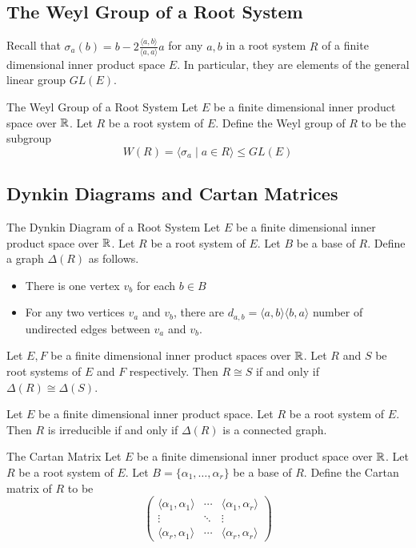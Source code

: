 \documentclass[a4paper]{article}
\begin{document}
\subsection{The Weyl Group of a Root System}
Recall that $\sigma_a(b)=b-2\frac{\langle a,b\rangle}{\langle a,a\rangle}a$ for any $a,b$ in a root system $R$ of a finite dimensional inner product space $E$. In particular, they are elements of the general linear group $GL(E)$. 

\begin{defn}{The Weyl Group of a Root System}{} Let $E$ be a finite dimensional inner product space over $\mathbb{R}$. Let $R$ be a root system of $E$. Define the Weyl group of $R$ to be the subgroup $$W(R)=\langle\sigma_a\;|\;a\in R\rangle\leq GL(E)$$
\end{defn}

\subsection{Dynkin Diagrams and Cartan Matrices}
\begin{defn}{The Dynkin Diagram of a Root System}{} Let $E$ be a finite dimensional inner product space over $\mathbb{R}$. Let $R$ be a root system of $E$. Let $B$ be a base of $R$. Define a graph $\Delta(R)$ as follows. 
\begin{itemize}
\item There is one vertex $v_b$ for each $b\in B$
\item For any two vertices $v_a$ and $v_b$, there are $d_{a,b}=\langle a,b\rangle\langle b,a\rangle$ number of undirected edges between $v_a$ and $v_b$. 
\end{itemize}
\end{defn}

\begin{prp}{}{} Let $E,F$ be a finite dimensional inner product spaces over $\mathbb{R}$. Let $R$ and $S$ be root systems of $E$ and $F$ respectively. Then $R\cong S$ if and only if $\Delta(R)\cong\Delta(S)$. 
\end{prp}

\begin{prp}{}{} Let $E$ be a finite dimensional inner product space. Let $R$ be a root system of $E$. Then $R$ is irreducible if and only if $\Delta(R)$ is a connected graph. 
\end{prp}

\begin{defn}{The Cartan Matrix}{} Let $E$ be a finite dimensional inner product space over $\mathbb{R}$. Let $R$ be a root system of $E$. Let $B=\{\alpha_1,\dots,\alpha_r\}$ be a base of $R$. Define the Cartan matrix of $R$ to be $$\begin{pmatrix}
\langle\alpha_1,\alpha_1\rangle & \cdots & \langle\alpha_1,\alpha_r\rangle\\
\vdots & \ddots & \vdots\\
\langle\alpha_r,\alpha_1\rangle & \cdots & \langle\alpha_r,\alpha_r\rangle
\end{pmatrix}$$
\end{defn}
\end{document}
